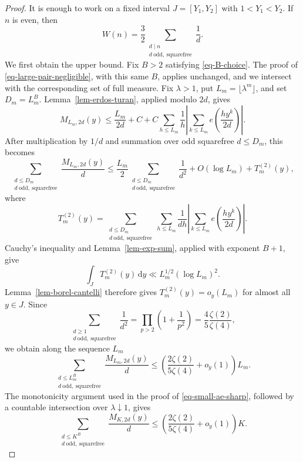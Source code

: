 \documentclass[11pt,reqno]{amsart}
\numberwithin{equation}{section}
\begin{document}
    \begin{proof}
        It is enough to work on a fixed interval $J=[Y_1,Y_2]$ with $1<Y_1<Y_2$. If $n$ is even, then
        \begin{equation}\label{eq-even-W-expansion}
            W(n)=\frac32
            \sum_{\substack{d\mid n\\d\ \mathrm{odd,\ squarefree}}}\frac1d.
        \end{equation}
        We first obtain the upper bound. Fix $B>2$ satisfying \eqref{eq-B-choice}. The proof of \eqref{eq-large-pair-negligible}, with this same $B$, applies unchanged, and we intersect with the corresponding set of full measure. Fix $\lambda>1$, put $L_m=\lfloor \lambda^m\rfloor$, and set $D_m=L_m^B$. Lemma~\ref{lem-erdos-turan}, applied modulo $2d$, gives
        $$
        M_{L_m,2d}(y)
        \le
        \frac{L_m}{2d}+C
        +C\sum_{h\le L_m}\frac1h
        \left|\sum_{k\le L_m}e\left(\frac{h y^k}{2d}\right)\right|.
        $$
        After multiplication by $1/d$ and summation over odd squarefree $d\le D_m$, this becomes
        $$
        \sum_{\substack{d\le D_m\\d\ \mathrm{odd,\ squarefree}}}
        \frac{M_{L_m,2d}(y)}d
        \le
        \frac{L_m}{2}
        \sum_{\substack{d\le D_m\\d\ \mathrm{odd,\ squarefree}}}\frac1{d^2}
        +O(\log L_m)+T_m^{(2)}(y),
        $$
        where
        $$
        T_m^{(2)}(y)=
        \sum_{\substack{d\le D_m\\d\ \mathrm{odd,\ squarefree}}}
        \sum_{h\le L_m}\frac1{dh}
        \left|\sum_{k\le L_m}e\left(\frac{h y^k}{2d}\right)\right|.
        $$
        Cauchy's inequality and Lemma~\ref{lem-exp-sum}, applied with exponent $B+1$, give
        $$
        \int_J T_m^{(2)}(y)\,\mathrm{d}y
        \ll L_m^{1/2}(\log L_m)^2.
        $$
        Lemma~\ref{lem-borel-cantelli} therefore gives $T_m^{(2)}(y)=o_y(L_m)$ for almost all $y\in J$. Since
        $$
        \sum_{\substack{d\ge1\\d\ \mathrm{odd,\ squarefree}}}\frac1{d^2}
        =
        \prod_{p>2}\left(1+\frac1{p^2}\right)
        =
        \frac45\frac{\zeta(2)}{\zeta(4)},
        $$
        we obtain along the sequence $L_m$
        $$
        \sum_{\substack{d\le L_m^B\\d\ \mathrm{odd,\ squarefree}}}
        \frac{M_{L_m,2d}(y)}d
        \le
        \left(\frac{2\zeta(2)}{5\zeta(4)}+o_y(1)\right)L_m.
        $$
        The monotonicity argument used in the proof of \eqref{eq-small-ae-sharp}, followed by a countable intersection over $\lambda\downarrow1$, gives
        \begin{equation}\label{eq-even-small-moduli}
            \sum_{\substack{d\le K^B\\d\ \mathrm{odd,\ squarefree}}}
            \frac{M_{K,2d}(y)}d
            \le
            \left(\frac{2\zeta(2)}{5\zeta(4)}+o_y(1)\right)K.
        \end{equation}


\end{proof}
\end{document}
